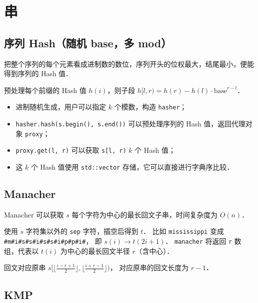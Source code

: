 \section{串}

\subsection{序列 Hash（随机 base，多 mod）}

把整个序列的每个元素看成进制数的数位，序列开头的位权最大，结尾最小，便能得到序列的 Hash 值．

预处理每个前缀的 Hash 值 $h(i)$，则子段 $h[l, r) = h(r) - h(l) \cdot \text{base}^{r - l}$．

\begin{itemize}[noitemsep]
    \item 进制随机生成，用户可以指定 $k$ 个模数，构造 {\tt hasher}；
    \item {\tt hasher.hash(s.begin(), s.end())} 可以预处理序列的 Hash 值，返回代理对象 {\tt proxy}；
    \item {\tt proxy.get(l, r)} 可以获取 {\tt s[l, r)} $k$ 个 Hash 值；
    \item 这 $k$ 个 Hash 值使用 {\tt std::vector} 存储，它可以直接进行字典序比较．
\end{itemize}



\subsection{Manacher}

Manacher 可以获取 $s$ 每个字符为中心的最长回文子串，时间复杂度为 $O(n)$．

使用 $s$ 字符集以外的 {\tt sep} 字符，插空后得到 $t$．
比如 {\tt mississippi} 变成 {\tt \#m\#i\#s\#s\#i\#s\#s\#i\#p\#p\#i\#}，
即 $s(i) \rightarrow t(2i + 1)$．
{\tt manacher} 将返回 {\tt r} 数组，代表以 $t(i)$ 为中心的最长回文半径 $r$（含中心）．

回文对应原串 $s\Big[\Big\lfloor\frac{i - r + 1}{2}\Big\rfloor, \Big\lfloor\frac{i + r - 1}{2}\Big\rfloor\Big)$，
对应原串的回文长度为 $r - 1$．



\newpage

\subsection{KMP}

